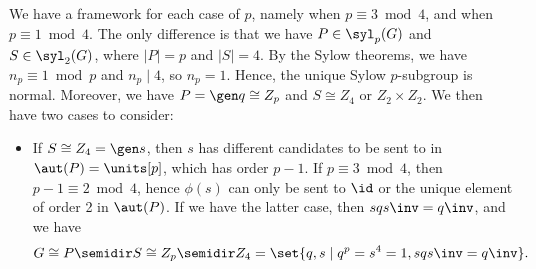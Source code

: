 \begin{sol}
    We have a framework for each case of $p$, namely  when $p \equiv 3 \bmod 4$, and  when $p \equiv 1 \bmod 4$.
	The only difference is that we have $P \in \syl_p(G)$ and $S \in \syl_2(G)$, where $|P| = p$ and $|S| = 4$.
	By the Sylow theorems, we have $n_p \equiv 1 \bmod p$ and $n_p \mid 4$, so $n_p = 1$.
	Hence, the unique Sylow $p$-subgroup is normal.
	Moreover, we have $P = \gen q \cong Z_p$ and $S \cong Z_4$ or $Z_2 \times Z_2$.
	We then have two cases to consider:
    \begin{itemize}
        \item If $S \cong Z_4 = \gen s$, then $s$ has different candidates to be sent to in $\aut(P) = \units[p]$, which has order $p - 1$.
	    If $p \equiv 3 \bmod 4$, then $p - 1 \equiv 2 \bmod 4$, hence $\phi(s)$ can only be sent to $\id$ or the unique element of order 2 in $\aut(P)$.
	    If we have the latter case, then $sqs\inv = q\inv$, and we have
        \[
        	G \cong P \semidir S \cong Z_p \semidir Z_4 = \set{q, s \mid q^p = s^4 = 1, sqs\inv = q\inv}.
        \]
        

\end{itemize}
\end{sol}
